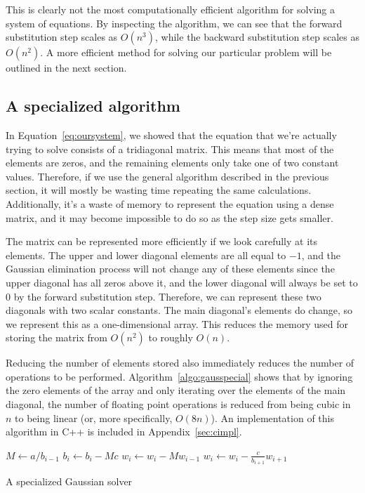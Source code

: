 \documentclass{article}
\begin{document}
        This is clearly not the most computationally efficient algorithm for solving a system of equations. By inspecting the algorithm, we can see that the forward substitution step scales as $O(n^3)$, while the backward substitution step scales as $O(n^2)$. A more efficient method for solving our particular problem will be outlined in the next section.

    \subsection{A specialized algorithm}

        In Equation~\ref{eq:oursystem}, we showed that the equation that we're actually trying to solve consists of a tridiagonal matrix. This means that most of the elements are zeros, and the remaining elements only take one of two constant values. Therefore, if we use the general algorithm described in the previous section, it will mostly be wasting time repeating the same calculations. Additionally, it's a waste of memory to represent the equation using a dense matrix, and it may become impossible to do so as the step size gets smaller.

        The matrix can be represented more efficiently if we look carefully at its elements. The upper and lower diagonal elements are all equal to $-1$, and the Gaussian elimination process will not change any of these elements since the upper diagonal has all zeros above it, and the lower diagonal will always be set to 0 by the forward substitution step. Therefore, we can represent these two diagonals with two scalar constants. The main diagonal's elements do change, so we represent this as a one-dimensional array. This reduces the memory used for storing the matrix from $O(n^2)$ to roughly $O(n)$.

        Reducing the number of elements stored also immediately reduces the number of operations to be performed. Algorithm~\ref{algo:gausspecial} shows that by ignoring the zero elements of the array and only iterating over the elements of the main diagonal, the number of floating point operations is reduced from being cubic in $n$ to being linear (or, more specifically, $O(8n)$). An implementation of this algorithm in C++ is included in Appendix~\ref{sec:cimpl}.

        \begin{algorithm}[t]
            \begin{algorithmic}
                 
                    \State $M \gets a / b_{i-1}$
                    \State $b_i \gets b_i - Mc$
                    \State $w_i \gets w_i - Mw_{i-1}$
                \EndFor
                 
                    \State $w_i \gets w_i - \frac{c}{b_{i+1}} w_{i+1}$
                \EndFor
            \end{algorithmic}
            \caption{A specialized Gaussian solver}
            \label{algo:gausspecial}
        \end{algorithm}
\end{document}
